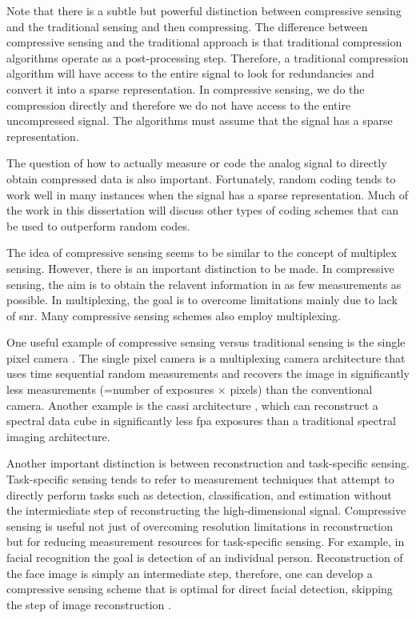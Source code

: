 Note that there is a subtle but powerful distinction between compressive sensing and the traditional sensing and then compressing. The difference between compressive sensing and the traditional approach is that traditional compression algorithms operate as a post-processing step. Therefore, a traditional compression algorithm will have access to the entire signal to look for redundancies and convert it into a sparse representation. In compressive sensing, we do the compression directly and therefore we do not have access to the entire uncompressed signal. The algorithms must assume that the signal has a sparse representation. 

The question of how to actually measure or code the analog signal to directly obtain compressed data is also important. Fortunately, random coding tends to work well in many instances when the signal has a sparse representation. Much of the work in this dissertation will discuss other types of coding schemes that can be used to outperform random codes. 

The idea of compressive sensing seems to be similar to the concept of multiplex sensing. However, there is an important distinction to be made. In compressive sensing, the aim is to obtain the relavent information in as few measurements as possible. In multiplexing, the goal is to overcome limitations mainly due to lack of \gls{snr}. Many compressive sensing schemes also employ multiplexing.

One useful example of compressive sensing versus traditional sensing is the single pixel camera \cite{duarte2008single}. The single pixel camera is a multiplexing camera architecture that uses time sequential random measurements and recovers the image in significantly less measurements (=number of exposures $\times$ pixels) than the conventional camera. Another example is the \gls{cassi} architecture \cite{wagadarikar2008single}, which can reconstruct a spectral data cube in significantly less \gls{fpa} exposures than a traditional spectral imaging architecture. 

Another important distinction is between reconstruction and task-specific sensing. Task-specific sensing tends to refer to measurement techniques that attempt to directly perform tasks such as detection, classification, and estimation without the intermiediate step of reconstructing the high-dimensional signal. Compressive sensing is useful not just of overcoming resolution limitations in reconstruction but for reducing measurement resources for task-specific sensing. For example, in facial recognition the goal is detection of an individual person. Reconstruction of the face image is simply an intermediate step, therefore, one can develop a compressive sensing scheme that is optimal for direct facial detection, skipping the step of image reconstruction \cite{pal2005face}. 


